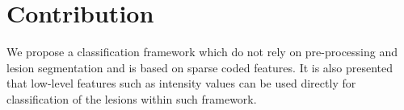\section{Contribution}
We propose a classification framework which do not rely on pre-processing and lesion segmentation and is based on sparse coded features. It is also presented that low-level features such as intensity values can be used directly for classification of the lesions within such framework. 




